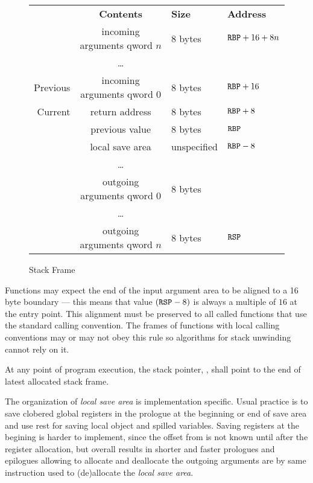 \begin{figure}
\caption{Stack Frame}
\label{fig-stack-frame}
\begin{center}
\begin{tabular}{r|cl|l}
\noalign{\smallskip}
\multicolumn{1}{l}{\bf Frame} &
\multicolumn{1}{c}{\bf Contents} &
\multicolumn{1}{l}{\bf Size} &
\multicolumn{1}{l}{\bf Address} \\
\noalign{\smallskip}  \cline{2-3}
& incoming arguments qword $n$ & 8 bytes & ${\tt{RBP}}+16+8n$ \\
& \dots & & \\
Previous& incoming arguments qword $0$ & 8 bytes & ${\tt{RBP}}+16$ \\ \cline{1-4} 
Current & return address & 8 bytes & ${\tt{RBP}}+8$\\ \cline{2-3}
& previous \RBP{} value & 8 bytes & ${\tt{RBP}}$ \\ \cline{2-3}
& local save area & unspecified & ${\tt{RBP}}-8$\\ 
& \dots & & \\ \cline {2-3}
& outgoing arguments qword $0$ & 8 bytes &\\
& \dots & & \\
& outgoing arguments qword $n$ & 8 bytes & ${\tt{RSP}}$ \\ \cline{2-3}
\end{tabular}
\end{center}
\end{figure}


Functions may expect the end of the input argument area to be aligned
to a 16 byte boundary --- this means that value $({\tt{RSP}} - 8)$ is always a
multiple of $16$ at the entry point. This alignment must be preserved to
all called functions that use the standard calling convention. The
frames of functions with local calling conventions may or may not obey
this rule so algorithms for stack unwinding cannot rely on it.

At any point of program execution, the stack pointer, \RSP, shall point to
the end of latest allocated stack frame.

The organization of \emph{local save area} is implementation specific. Usual
practice is to save clobered global registers in the prologue at the beginning
or end of save area and use rest for saving local object and spilled variables.
Saving registers at the begining is harder to implement, since the offset
from \RBP{} is not known until after the register allocation, but overall results
in shorter and faster prologues and epilogues allowing to allocate and deallocate
the outgoing arguments are by same instruction used to (de)allocate the \emph{local
save area}.

